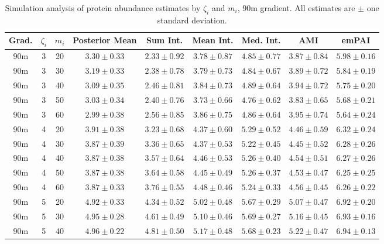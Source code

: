 \begin{table}
\begin{center}
\caption{Simulation analysis of protein abundance estimates by $\zeta_i$ and $m_i$, 90m gradient. All estimates are $\pm$ one standard deviation. \label{supp:proteomics:tab:sim_estimates_90m}}
\begin{tabular}{ccc|c|ccccc}
 Grad. & $\zeta_i$ & $m_i$ & Posterior Mean & Sum Int. & Mean Int. & Med. Int. & AMI & emPAI \\ 
  \hline
90m &   3 &  20 & $3.30 \pm 0.33$ & $2.33 \pm 0.92$ & $3.78 \pm 0.87$ & $4.85 \pm 0.77$ & $3.87 \pm 0.84$ & $5.98 \pm 0.16$ \\ 
  90m &   3 &  30 & $3.19 \pm 0.33$ & $2.38 \pm 0.78$ & $3.79 \pm 0.73$ & $4.84 \pm 0.67$ & $3.89 \pm 0.72$ & $5.84 \pm 0.19$ \\ 
  90m &   3 &  40 & $3.09 \pm 0.35$ & $2.46 \pm 0.81$ & $3.84 \pm 0.73$ & $4.89 \pm 0.64$ & $3.94 \pm 0.72$ & $5.75 \pm 0.20$ \\ 
  90m &   3 &  50 & $3.03 \pm 0.34$ & $2.40 \pm 0.76$ & $3.73 \pm 0.66$ & $4.76 \pm 0.62$ & $3.83 \pm 0.65$ & $5.68 \pm 0.21$ \\ 
  90m &   3 &  60 & $2.99 \pm 0.38$ & $2.56 \pm 0.85$ & $3.86 \pm 0.75$ & $4.86 \pm 0.64$ & $3.95 \pm 0.74$ & $5.64 \pm 0.24$ \\ 
   \hline
90m &   4 &  20 & $3.91 \pm 0.38$ & $3.23 \pm 0.68$ & $4.37 \pm 0.60$ & $5.29 \pm 0.52$ & $4.46 \pm 0.59$ & $6.32 \pm 0.24$ \\ 
  90m &   4 &  30 & $3.87 \pm 0.39$ & $3.36 \pm 0.65$ & $4.37 \pm 0.53$ & $5.22 \pm 0.45$ & $4.45 \pm 0.52$ & $6.28 \pm 0.26$ \\ 
  90m &   4 &  40 & $3.87 \pm 0.38$ & $3.57 \pm 0.64$ & $4.46 \pm 0.53$ & $5.26 \pm 0.40$ & $4.54 \pm 0.51$ & $6.27 \pm 0.26$ \\ 
  90m &   4 &  50 & $3.87 \pm 0.38$ & $3.64 \pm 0.58$ & $4.45 \pm 0.49$ & $5.26 \pm 0.37$ & $4.53 \pm 0.47$ & $6.25 \pm 0.25$ \\ 
  90m &   4 &  60 & $3.87 \pm 0.33$ & $3.76 \pm 0.55$ & $4.48 \pm 0.46$ & $5.24 \pm 0.33$ & $4.56 \pm 0.45$ & $6.26 \pm 0.22$ \\ 
   \hline
90m &   5 &  20 & $4.92 \pm 0.33$ & $4.34 \pm 0.52$ & $5.02 \pm 0.48$ & $5.67 \pm 0.29$ & $5.07 \pm 0.47$ & $6.92 \pm 0.20$ \\ 
  90m &   5 &  30 & $4.95 \pm 0.28$ & $4.61 \pm 0.49$ & $5.10 \pm 0.46$ & $5.69 \pm 0.27$ & $5.16 \pm 0.45$ & $6.93 \pm 0.16$ \\ 
  90m &   5 &  40 & $4.96 \pm 0.22$ & $4.81 \pm 0.50$ & $5.17 \pm 0.48$ & $5.68 \pm 0.23$ & $5.22 \pm 0.47$ & $6.94 \pm 0.13$ \\ 

\end{tabular}
\end{center}
\end{table}
